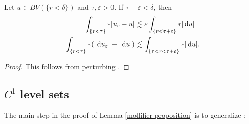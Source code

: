 \begin{lemma}\label{Giusti72}
Let $u \in BV(\{r < \delta\})$ and $\tau, \varepsilon > 0$. If $\tau + \varepsilon < \delta$, then
\begin{align*}
\int_{\{r < \tau\}} *|u_\varepsilon - u| &\lesssim \varepsilon \int_{\{r < \tau + \varepsilon\}} *|\mathop{}\!\mathrm{d} u|\\
\int_{\{r < \tau\}} *(|\mathop{}\!\mathrm{d} u_\varepsilon| - |\mathop{}\!\mathrm{d} u|) &\lesssim \int_{\{\tau < r < \tau + \varepsilon\}} *|\mathop{}\!\mathrm{d} u|.
\end{align*}
\end{lemma}
\begin{proof}
This follows from perturbing \cite[Lemma 7.2]{Giusti77}.
\end{proof}



\subsection{\texorpdfstring{$C^1$}{C1} level sets}
The main step in the proof of Lemma \ref{mollifier proposition} is to generalize \cite[Theorem 7.3, Remark 7.4]{Giusti77}:

